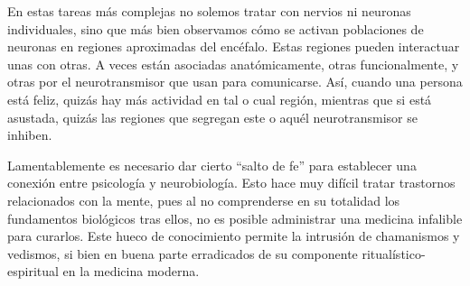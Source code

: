 En estas tareas más complejas no solemos tratar con nervios ni neuronas individuales, sino que más bien observamos cómo se activan poblaciones de neuronas en regiones aproximadas del encéfalo. Estas regiones pueden interactuar unas con otras. A veces están asociadas anatómicamente, otras funcionalmente, y otras por el neurotransmisor que usan para comunicarse. Así, cuando una persona está feliz, quizás hay más actividad en tal o cual región, mientras que si está asustada, quizás las regiones que segregan este o aquél neurotransmisor se inhiben.

Lamentablemente es necesario dar cierto \enquote{salto de fe} para establecer una conexión entre psicología y neurobiología. Esto hace muy difícil tratar trastornos relacionados con la mente, pues al no comprenderse en su totalidad los fundamentos biológicos tras ellos, no es posible administrar una medicina infalible para curarlos. Este hueco de conocimiento permite la intrusión de chamanismos y vedismos, si bien en buena parte erradicados de su componente ritualístico-espiritual en la medicina moderna.

\newpage
